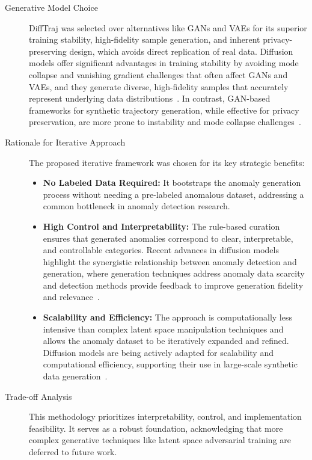 \begin{description}
  \item[Generative Model Choice] DiffTraj was selected over alternatives like GANs and VAEs for its superior training stability, high-fidelity sample generation, and inherent privacy-preserving design, which avoids direct replication of real data. Diffusion models offer significant advantages in training stability by avoiding mode collapse and vanishing gradient challenges that often affect GANs and VAEs, and they generate diverse, high-fidelity samples that accurately represent underlying data distributions~\cite{liuAnomalyDetectionGeneration2025}. In contrast, GAN-based frameworks for synthetic trajectory generation, while effective for privacy preservation, are more prone to instability and mode collapse challenges~\cite{caoGeneratingMobilityTrajectories2021}.
  \item[Rationale for Iterative Approach] The proposed iterative framework was chosen for its key strategic benefits:
    \begin{itemize}[leftmargin=*]
      \item \textbf{No Labeled Data Required:} It bootstraps the anomaly generation process without needing a pre-labeled anomalous dataset, addressing a common bottleneck in anomaly detection research.
      \item \textbf{High Control and Interpretability:} The rule-based curation ensures that generated anomalies correspond to clear, interpretable, and controllable categories. Recent advances in diffusion models highlight the synergistic relationship between anomaly detection and generation, where generation techniques address anomaly data scarcity and detection methods provide feedback to improve generation fidelity and relevance~\cite{liuAnomalyDetectionGeneration2025}.
      \item \textbf{Scalability and Efficiency:} The approach is computationally less intensive than complex latent space manipulation techniques and allows the anomaly dataset to be iteratively expanded and refined. Diffusion models are being actively adapted for scalability and computational efficiency, supporting their use in large-scale synthetic data generation~\cite{liuAnomalyDetectionGeneration2025}.
    \end{itemize}
  \item[Trade-off Analysis] This methodology prioritizes interpretability, control, and implementation feasibility. It serves as a robust foundation, acknowledging that more complex generative techniques like latent space adversarial training are deferred to future work.
\end{description}
